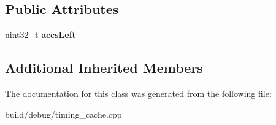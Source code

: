 \subsection*{Public Attributes}
\begin{DoxyCompactItemize}
\item 
\hypertarget{classReplAccessEvent_aa8eb9a7207400d43644f3fef71bf2473}{uint32\-\_\-t {\bfseries accs\-Left}}\label{classReplAccessEvent_aa8eb9a7207400d43644f3fef71bf2473}

\end{DoxyCompactItemize}
\subsection*{Additional Inherited Members}


The documentation for this class was generated from the following file\-:\begin{DoxyCompactItemize}
\item 
build/debug/timing\-\_\-cache.\-cpp\end{DoxyCompactItemize}
